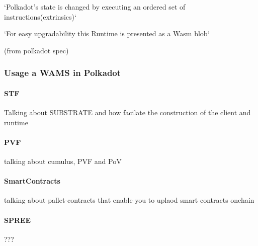 \documentclass[../main.tex]{subfiles}
\begin{document}
`Polkadot’s state is changed by executing an ordered set of instructions(extrinsics)`

`For easy upgradability this Runtime is presented as a Wasm blob`

(from polkadot spec)

\subsubsection{Usage a WAMS in Polkadot}
\paragraph{STF}

Talking about SUBSTRATE and how facilate the construction of the client and runtime

\paragraph{PVF}

talking about cumulus, PVF and PoV
\paragraph{SmartContracts}

talking about pallet-contracts that enable you to uplaod smart contracts onchain

\paragraph{SPREE}

???
\end{document}

